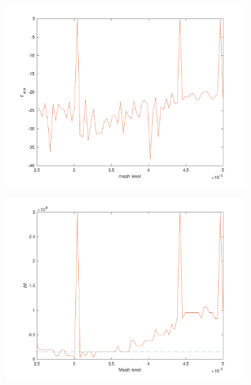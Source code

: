 \documentclass[12pt,a4paper]{article}
\begin{document}
{\begin{figure}[h]
\begin{center}
		\begin{subfigure}{0.3\linewidth}
			\includegraphics[scale=0.3]{minGamma_vs_mesh_level.pdf}
			\caption{}
			\label{eq:minG vs mesh}
		\end{subfigure}
		\begin{subfigure}{0.3\linewidth}
			\includegraphics[scale=0.3]{DeltaF_vs_mesh_level.pdf}
			\caption{}
			\label{eq:Df vs mesh}
		\end{subfigure}
		\begin{subfigure}{0.3\linewidth}

\end{subfigure}
\end{center}
\end{figure}}
\end{document}
